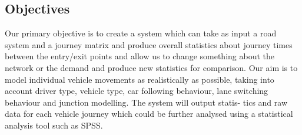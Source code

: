 \subsection{Objectives}
Our primary objective is to create a system which can take as input a road system and a journey matrix and produce overall statistics about journey times between the entry/exit points and allow us to change something about the network or the demand and produce new statistics for comparison. Our aim is to model individual vehicle movements as realistically as possible, taking into account driver type, vehicle type, car following behaviour, lane switching behaviour and junction modelling. The system will output statis- tics and raw data for each vehicle journey which could be further analysed using a statistical analysis tool such as SPSS.

